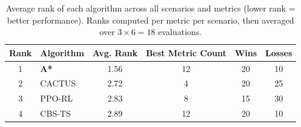 \begin{table}[htbp]
\centering
\caption{Average rank of each algorithm across all scenarios and metrics (lower rank = better performance). Ranks computed per metric per scenario, then averaged over $3 \times 6 = 18$ evaluations.}
\label{tab:ranking}
\begin{tabular}{@{}clcccc@{}}
\toprule
\textbf{Rank} & \textbf{Algorithm} & \textbf{Avg. Rank} & \textbf{Best Metric Count} & \textbf{Wins} & \textbf{Losses} \\
\midrule
1 & \textbf{A*} & 1.56 & 12 & 20 & 10 \\
2 & CACTUS & 2.72 & 4 & 20 & 25 \\
3 & PPO-RL & 2.83 & 8 & 15 & 30 \\
4 & CBS-TS & 2.89 & 12 & 20 & 10 \\
\bottomrule
\end{tabular}
\end{table}